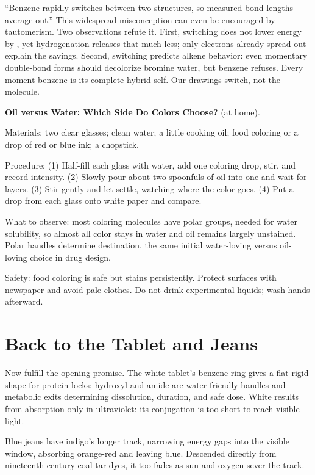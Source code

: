 \begin{wuqu}
``Benzene rapidly switches between two structures, so measured bond lengths average out.'' This widespread misconception can even be encouraged by tautomerism. Two observations refute it. First, switching does not lower energy by , yet hydrogenation releases that much less; only electrons already spread out explain the savings. Second, switching predicts alkene behavior: even momentary double-bond forms should decolorize bromine water, but benzene refuses. Every moment benzene is its complete hybrid self. Our drawings switch, not the molecule.
\end{wuqu}

\begin{shiyan}
\textbf{Oil versus Water: Which Side Do Colors Choose?} (at home).

Materials: two clear glasses; clean water; a little cooking oil; food coloring or a drop of red or blue ink; a chopstick.

Procedure: (1) Half-fill each glass with water, add one coloring drop, stir, and record intensity. (2) Slowly pour about two spoonfuls of oil into one and wait for layers. (3) Stir gently and let settle, watching where the color goes. (4) Put a drop from each glass onto white paper and compare.

What to observe: most coloring molecules have polar groups, needed for water solubility, so almost all color stays in water and oil remains largely unstained. Polar handles determine destination, the same initial water-loving versus oil-loving choice in drug design.

Safety: food coloring is safe but stains persistently. Protect surfaces with newspaper and avoid pale clothes. Do not drink experimental liquids; wash hands afterward.
\end{shiyan}

\section{Back to the Tablet and Jeans}

Now fulfill the opening promise. The white tablet's benzene ring gives a flat rigid shape for protein locks; hydroxyl and amide are water-friendly handles and metabolic exits determining dissolution, duration, and safe dose. White results from absorption only in ultraviolet: its conjugation is too short to reach visible light.

Blue jeans have indigo's longer track, narrowing energy gaps into the visible window, absorbing orange-red and leaving blue. Descended directly from nineteenth-century coal-tar dyes, it too fades as sun and oxygen sever the track.

